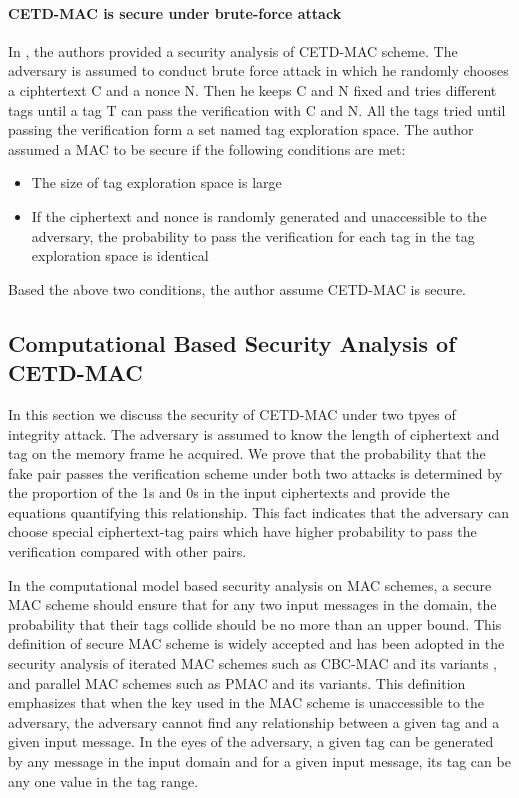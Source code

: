\paragraph{CETD-MAC is secure under brute-force attack}
In \cite{}, the authors provided a security analysis of CETD-MAC scheme. The adversary is assumed to conduct brute force attack in which he randomly chooses a ciphtertext C and a nonce N. Then he keeps C and N fixed and tries different tags until a tag T can pass the verification with C and N. All the tags tried until passing the verification form a set named tag exploration space. The author assumed a MAC to be secure if the following conditions are met:
\begin{itemize}
	\item The size of tag exploration space is large
	\item If the ciphertext and nonce is randomly generated and unaccessible to the adversary, the probability to pass the verification for each tag in the tag exploration space is identical
\end{itemize}
Based the above two conditions, the author assume CETD-MAC is secure.

\subsection{Computational Based Security Analysis of CETD-MAC}
In this section we discuss the security of CETD-MAC under two tpyes of integrity attack.  The adversary is assumed to know the length of ciphertext and tag on the memory frame he acquired. 
We prove that the probability that the fake pair passes the verification scheme under both two attacks is determined by the proportion of the 1s and 0s in the input ciphertexts and provide the equations quantifying this relationship. This fact indicates that the adversary can choose special ciphertext-tag pairs which have higher probability to pass the verification compared with other pairs.  

In the computational model based security analysis on MAC schemes, a secure MAC scheme should ensure that for any two input messages in the domain, the probability that their tags collide should be no more than an upper bound. This definition of secure MAC scheme is widely accepted and has been adopted in the security analysis of iterated MAC schemes such as CBC-MAC \cite{} and its variants \cite{}, and parallel MAC schemes such as PMAC \cite{} and its variants\cite{}. This definition emphasizes that when the key used in the MAC scheme is unaccessible to the adversary, the adversary cannot find any relationship between a given tag and a given input message. In the eyes of the adversary, a given tag can be generated by any message in the input domain and for a given input message, its tag can be any one value in the tag range. 
